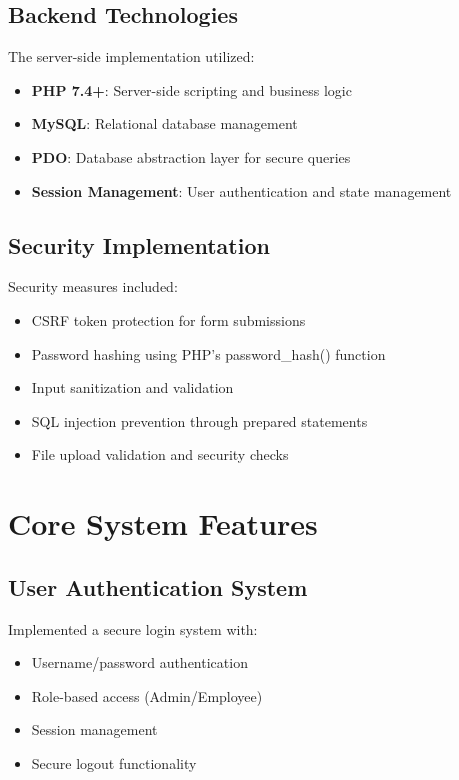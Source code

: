 \subsection{Backend Technologies}
The server-side implementation utilized:
\begin{itemize}
    \item \textbf{PHP 7.4+}: Server-side scripting and business logic
    \item \textbf{MySQL}: Relational database management
    \item \textbf{PDO}: Database abstraction layer for secure queries
    \item \textbf{Session Management}: User authentication and state management
\end{itemize}

\subsection{Security Implementation}
Security measures included:
\begin{itemize}
    \item CSRF token protection for form submissions
    \item Password hashing using PHP's password\_hash() function
    \item Input sanitization and validation
    \item SQL injection prevention through prepared statements
    \item File upload validation and security checks
\end{itemize}

\section{Core System Features}

\subsection{User Authentication System}
Implemented a secure login system with:
\begin{itemize}
    \item Username/password authentication
    \item Role-based access (Admin/Employee)
    \item Session management
    \item Secure logout functionality
\end{itemize}

